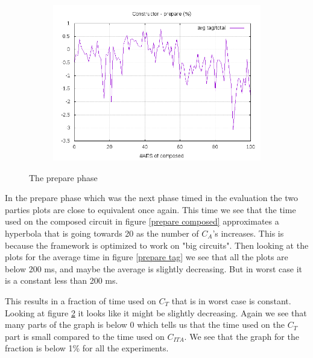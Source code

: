 \documentclass[10pt,a4paper]{article}
\begin{document}
\begin{figure}[h]
\begin{subfigure}[t]{0.3\textwidth}
        \includegraphics[width=\textwidth]{const_prepare_frac}
        \caption{}
        \label{prepare frac}
    \end{subfigure}
    \caption{The prepare phase}
\end{figure}

In the prepare phase which was the next phase timed in the evaluation the two parties plots are close to equivalent once again. This time we see that the time used on the composed circuit in figure \ref{prepare composed} approximates a hyperbola that is going towards 20 as the number of $C_A$'s increases. This is because the framework is optimized to work on "big circuits".
Then looking at the plots for the average time in figure \ref{prepare tag} we see that all the plots are below 200 ms, and maybe the average is slightly decreasing. But in worst case it is a constant less than 200 ms.

This results in a fraction of time used on $C_T$ that is in worst case is constant. Looking at figure \ref{prepare frac} it looks like it might be slightly decreasing. Again we see that many parts of the graph is below 0 which tells us that the time used on the $C_T$ part is small compared to the time used on $C_{ITA}$. We see that the graph for the fraction is below 1\% for all the experiments.
\end{document}
